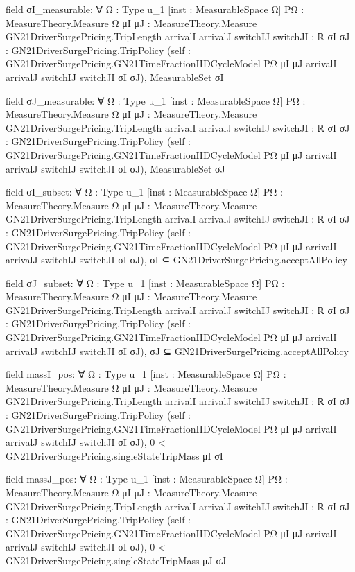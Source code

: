 \documentclass[10pt]{article}
\begin{document}
\begin{ReviewVerbatim}
field σI_measurable:
∀ {Ω : Type u_1} [inst : MeasurableSpace Ω] {PΩ : MeasureTheory.Measure Ω}
  {μI μJ : MeasureTheory.Measure GN21DriverSurgePricing.TripLength} {arrivalI arrivalJ switchIJ switchJI : ℝ}
  {σI σJ : GN21DriverSurgePricing.TripPolicy}
  (self : GN21DriverSurgePricing.GN21TimeFractionIIDCycleModel PΩ μI μJ arrivalI arrivalJ switchIJ switchJI σI σJ),
  MeasurableSet σI

field σJ_measurable:
∀ {Ω : Type u_1} [inst : MeasurableSpace Ω] {PΩ : MeasureTheory.Measure Ω}
  {μI μJ : MeasureTheory.Measure GN21DriverSurgePricing.TripLength} {arrivalI arrivalJ switchIJ switchJI : ℝ}
  {σI σJ : GN21DriverSurgePricing.TripPolicy}
  (self : GN21DriverSurgePricing.GN21TimeFractionIIDCycleModel PΩ μI μJ arrivalI arrivalJ switchIJ switchJI σI σJ),
  MeasurableSet σJ

field σI_subset:
∀ {Ω : Type u_1} [inst : MeasurableSpace Ω] {PΩ : MeasureTheory.Measure Ω}
  {μI μJ : MeasureTheory.Measure GN21DriverSurgePricing.TripLength} {arrivalI arrivalJ switchIJ switchJI : ℝ}
  {σI σJ : GN21DriverSurgePricing.TripPolicy}
  (self : GN21DriverSurgePricing.GN21TimeFractionIIDCycleModel PΩ μI μJ arrivalI arrivalJ switchIJ switchJI σI σJ),
  σI ⊆ GN21DriverSurgePricing.acceptAllPolicy

field σJ_subset:
∀ {Ω : Type u_1} [inst : MeasurableSpace Ω] {PΩ : MeasureTheory.Measure Ω}
  {μI μJ : MeasureTheory.Measure GN21DriverSurgePricing.TripLength} {arrivalI arrivalJ switchIJ switchJI : ℝ}
  {σI σJ : GN21DriverSurgePricing.TripPolicy}
  (self : GN21DriverSurgePricing.GN21TimeFractionIIDCycleModel PΩ μI μJ arrivalI arrivalJ switchIJ switchJI σI σJ),
  σJ ⊆ GN21DriverSurgePricing.acceptAllPolicy

field massI_pos:
∀ {Ω : Type u_1} [inst : MeasurableSpace Ω] {PΩ : MeasureTheory.Measure Ω}
  {μI μJ : MeasureTheory.Measure GN21DriverSurgePricing.TripLength} {arrivalI arrivalJ switchIJ switchJI : ℝ}
  {σI σJ : GN21DriverSurgePricing.TripPolicy}
  (self : GN21DriverSurgePricing.GN21TimeFractionIIDCycleModel PΩ μI μJ arrivalI arrivalJ switchIJ switchJI σI σJ),
  0 < GN21DriverSurgePricing.singleStateTripMass μI σI

field massJ_pos:
∀ {Ω : Type u_1} [inst : MeasurableSpace Ω] {PΩ : MeasureTheory.Measure Ω}
  {μI μJ : MeasureTheory.Measure GN21DriverSurgePricing.TripLength} {arrivalI arrivalJ switchIJ switchJI : ℝ}
  {σI σJ : GN21DriverSurgePricing.TripPolicy}
  (self : GN21DriverSurgePricing.GN21TimeFractionIIDCycleModel PΩ μI μJ arrivalI arrivalJ switchIJ switchJI σI σJ),
  0 < GN21DriverSurgePricing.singleStateTripMass μJ σJ


\end{ReviewVerbatim}
\end{document}
